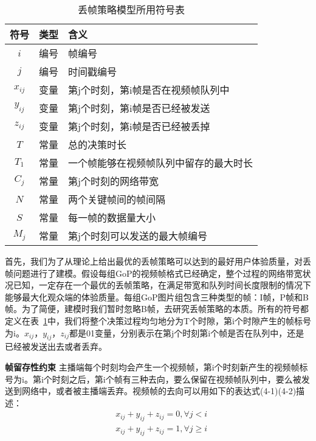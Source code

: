 \begin{table}[tb]
\footnotesize
\centering
\caption{丢帧策略模型所用符号表}
\label{ip_var}
    \begin{tabularx}{\linewidth}{ccX}
        \toprule[1.5pt]
        \textbf{符号} & \textbf{类型} & \textbf{含义}                      \\ \midrule[1pt]
        $i$               & 编号         & 帧编号                           \\
        $j$               & 编号         & 时间戳编号                            \\
        $x_{ij}$             & 变量      & 第j个时刻，第i帧是否在视频帧队列中\\
        $y_{ij}$             & 变量      & 第j个时刻，第i帧是否已经被发送     \\
        $z_{ij}$             & 变量      & 第j个时刻，第i帧是否已经被丢掉  \\
        $T$               & 常量         &  总的决策时长                        \\
        $T_1$             & 常量       & 一个帧能够在视频帧队列中留存的最大时长 \\
        $C_j$              & 常量         & 第j个时刻的网络带宽  \\
        $N$               & 常量         & 两个关键帧间的帧间隔                      \\
        $S$            & 常量         & 每一帧的数据量大小                       \\
        $M_{j}$       & 常量         & 第j个时刻可以发送的最大帧编号 \\
        \bottomrule[1.5pt]
    \end{tabularx}
\end{table}

首先，我们为了从理论上给出最优的丢帧策略可以达到的最好用户体验质量，对丢帧问题进行了建模。假设每组GoP的视频帧格式已经确定，整个过程的网络带宽状况已知，一定存在一个最优的丢帧策略，在满足带宽和队列时间长度限制的情况下能够最大化观众端的体验质量。每组GoP图片组包含三种类型的帧：I帧，P帧和B帧。为了简便，建模时我们暂时忽略B帧，去研究丢帧策略的本质。所有的符号都定义在表~\ref{ip_var}中，我们将整个决策过程均匀地分为T个时隙，第i个时隙产生的帧标号为i。$x_{ij}$，$y_{ij}$，$z_{ij}$都是01变量，分别表示在第j个时刻第i个帧是否在队列中，还是已经被发送出去或者丢弃。

\textbf{帧留存性约束} 主播端每个时刻均会产生一个视频帧，第i个时刻新产生的视频帧标号为i。第i个时刻之后，第i个帧有三种去向，要么保留在视频帧队列中，要么被发送到网络中，或者被主播端丢弃。视频帧的去向可以用如下的表达式(4-1)(4-2)描述：
\begin{align}
  & x_{ij}+y_{ij}+z_{ij} = 0, \forall j<i \\
  & x_{ij}+y_{ij}+z_{ij} = 1, \forall j\geq i
\end{align}

